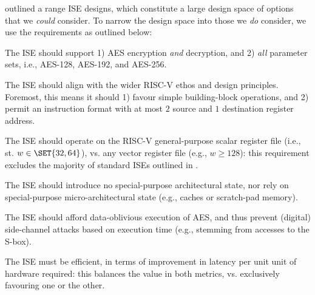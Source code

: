 
outlined a range ISE designs, which constitute a large design space of
options that we {\em could} consider.  To narrow the design space into
those we {\em do} consider, we use the requirements as outlined below:

\begin{requirement}\label{req:1}
The ISE should support
1) AES encryption {\em and} decryption,
   and
2) {\em all} parameter sets, i.e., AES-128, AES-192, and AES-256.
\end{requirement}

\begin{requirement}\label{req:2}
The ISE should align with the wider RISC-V ethos and design principles.
Foremost, this means it should 
1) favour simple building-block operations,
   and
2) permit an instruction format with at most $2$ source and $1$ destination register address.
\end{requirement}

\begin{requirement}\label{req:3}
The ISE should operate on 
the RISC-V general-purpose scalar register file 
(i.e., st. $w \in \SET{32,64}$),
vs. 
any                        vector register file
(e.g., $w \ge 128$):
this requirement excludes the majority of standard ISEs outlined in 
.
\end{requirement}

\begin{requirement}\label{req:4}
The ISE should introduce no
special-purpose       architectural state, 
nor rely on
special-purpose micro-architectural state
(e.g., caches or scratch-pad memory).
\end{requirement}

\begin{requirement}\label{req:5}
The ISE should afford data-oblivious execution of AES, and thus prevent 
(digital) side-channel attacks based on execution time 
(e.g., stemming from accesses to the S-box).
\end{requirement}


\begin{requirement}
The ISE must be efficient, in terms of improvement in latency per unit
unit of hardware required: this balances the value in both metrics, vs.
exclusively favouring one or the other.
\end{requirement}

